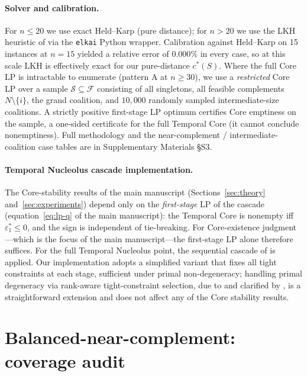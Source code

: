 \documentclass[11pt]{article}
\newcommand{\F}{\mathcal{F}}
\theoremstyle{plain}
\theoremstyle{definition}
\theoremstyle{remark}
\begin{document}
\paragraph{Solver and calibration.} For $n\le 20$ we use exact Held--Karp (pure distance); for $n>20$ we use the LKH heuristic of \citet{helsgaun2000effective} via the \texttt{elkai} Python wrapper. Calibration against Held--Karp on 15 instances at $n=15$ yielded a relative error of $0.000\%$ in every case, so at this scale LKH is effectively exact for our pure-distance $c^{\ast}(S)$. Where the full Core LP is intractable to enumerate (pattern A at $n\ge 30$), we use a \emph{restricted} Core LP over a sample $\mathcal{S}\subseteq\F$ consisting of all singletons, all feasible complements $N\setminus\{i\}$, the grand coalition, and $10{,}000$ randomly sampled intermediate-size coalitions. A strictly positive first-stage LP optimum certifies Core emptiness on the sample, a one-sided certificate for the full Temporal Core (it cannot conclude nonemptiness). Full methodology and the near-complement / intermediate-coalition case tables are in Supplementary Materials \S S3.
\label{app:algorithmic-details}

\paragraph{Temporal Nucleolus cascade implementation.} The Core-stability results of the main manuscript (Sections~\ref{sec:theory} and~\ref{sec:experiments}) depend only on the \emph{first-stage} LP of the cascade (equation~\eqref{eq:lp-q} of the main manuscript): the Temporal Core is nonempty iff $\varepsilon_1^{\ast}\le 0$, and the sign is independent of tie-breaking. For Core-existence judgment---which is the focus of the main manuscript---the first-stage LP alone therefore suffices. For the full Temporal Nucleolus point, the sequential cascade of \citet{guajardo2015nucleolus} is applied. Our implementation adopts a simplified variant that fixes all tight constraints at each stage, sufficient under primal non-degeneracy; handling primal degeneracy via rank-aware tight-constraint selection, due to \citet{kopelowitz1967computation} and clarified by \citet{guajardo2015nucleolus}, is a straightforward extension and does not affect any of the Core stability results.

\section{Balanced-near-complement: coverage audit}
\label{app:open-problem}
\end{document}
